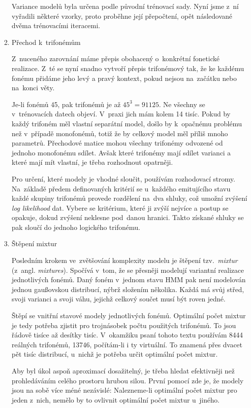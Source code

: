 \begin{enumerate}
Variance modelů byla určena podle původní trénovací sady. Nyní jsme z~ní
vyřadili některé vzorky, proto proběhne její přepočtení, opět následované dvěma
trénovacími iteracemi.

\item{Přechod k~trifonémům}
\label{item:htktrain:triphones}

Z~nuceného zarovnání máme přepis obohacený o~konkrétní fonetické realizace. Z~té
se nyní snadno vytvoří přepis trifonémový tak, že ke každému fonému přidáme
jeho levý a pravý kontext, pokud nejsou na~začátku nebo na~konci věty.

Je-li fonémů 45, pak trifonémů je až $45^3 = 91125$. Ne všechny se v~trénovacích
datech objeví. V~praxi jich mám kolem 14 tisíc. Pokud by každý trifoném měl
vlastní separátní model, došlo by k~opačnému problému než v~případě monofonémů,
totiž že by celkový model měl příliš mnoho parametrů. Přechodové matice mohou
všechny trifonémy odvozené od jednoho monofonému sdílet. Avšak které trifonémy
mají sdílet varianci a které mají mít vlastní, je třeba rozhodnout opatrněji.

Pro určení, které modely je vhodné sloučit, používám rozhodovací stromy.
Na~základě předem definovaných kritérií se u~každého emitujícího stavu každé
skupiny trifonémů provede rozdělení na~dva shluky, což umožní zvýšení
\textit{log likelihood} dat. Vybere se kritérium, které ji zvýší nejvíce a
postup se opakuje, dokud zvýšení neklesne pod~danou hranici. Takto získané
shluky se pak sloučí do jednoho logického trifonému.

\item{Štěpení mixtur}

Posledním krokem ve~zvětšování komplexity modelu je štěpení tzv.~\textit{mixtur}
(z~angl. \textit{mixtures}). Spočívá v~tom, že se přesněji modelují variantní
realizace jednotlivých fonémů. Daný foném v~jednom stavu HMM pak není modelován jednou gaußovskou
distribucí, nýbrž složením několika. Každá má svůj střed, svoji varianci a svoji
váhu, jejichž celkový součet musí být roven jedné.

Štěpí se vnitřní stavové modely jednotlivých fonémů. Optimální počet
mixtur je tedy potřeba zjistit pro trojnásobek počtu použitých trifonémů. To
jsou řádově tisíce až desítky tisíc. V~okamžiku psaní tohoto textu používám 8444
reálných trifonémů, 13746, počítám-li i ty virtuální. To znamená přes dvacet pět
tisíc distribucí, u~nichž je potřeba určit optimální počet mixtur.

Aby byl úkol aspoň aproximací dosažitelný, je třeba hledat efektivněji než
prohledáváním celého prostoru hrubou silou. První pomocí zde je, že modely jsou
na sobě více méné nezávislé: Nalezneme-li optimální počet mixtur pro jeden
z~nich, nemělo by to ovlivnit optimální počet mixtur u~jiného.


\end{enumerate}
